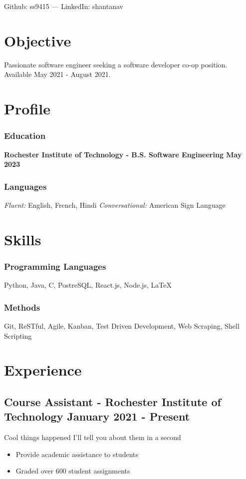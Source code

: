 \documentclass[11pt, letterpaper]{article}
\renewcommand{\maketitle} {
    \begin{center}    
        {\LARGE\bfseries \theauthor}

        \vspace{.5em}

        Github: ss9415 --- LinkedIn: shantanav
    \end{center}
    \thispagestyle{empty}
}
\begin{document}
    \author{Shantanav Saurav}

    \maketitle

    \section{Objective}
        Passionate software engineer seeking a software developer co-op position. 
        Available May 2021 - August 2021.

    \section{Profile}
        \subsubsection{Education}
            \textbf{Rochester Institute of Technology - B.S. Software Engineering \hfill May 2023}
        \subsubsection{Languages}
            \emph{Fluent:} English, French, Hindi 
            \emph{Conversational:} American Sign Language

    \section{Skills}
        \subsubsection{Programming Languages}
            Python, Java, C, PostreSQL, React.js, Node.js, \LaTeX
        \subsubsection{Methods}
            Git, ReSTful, Agile, Kanban, Test Driven Development, Web Scraping, Shell Scripting

    \section{Experience}
        \subsection{Course Assistant - Rochester Institute of Technology \hfill January 2021 - Present}
            Cool things happened I'll tell you about them in a second
            \begin{itemize}[nosep]
                \item Provide academic assistance to students 
                \item Graded over 600 student assignments
            \end{itemize}
\end{document}
